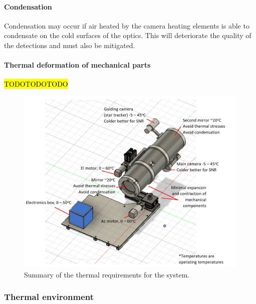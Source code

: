 \paragraph{Condensation}
Condensation may occur if air heated by the camera heating elements is able to condensate on the cold surfaces of the optics. This will deteriorate the quality of the detections and must also be mitigated.  \

\paragraph{Thermal deformation of mechanical parts}

\hl{TODOTODOTODO}


	\begin{figure}[h!]
    \centering
    \includegraphics[scale=0.8]{4-experiment-design/img/mechanical/thermalrequirements.PNG}
    	\caption{Summary of the thermal requirements for the system.}
	\label{fig:thermalrequirements}
	\end{figure}


















\subsubsection{Thermal environment}

